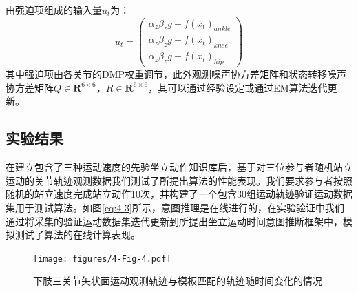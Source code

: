 由强迫项组成的输入量$u_t$为：
\begin{equation}
    u_t=\left(\begin{array}{l}
        \alpha_z \beta_z g+ f\left(x_t\right)_{ankle}\\
        \alpha_z \beta_z g+ f\left(x_t\right)_{knee}\\
        \alpha_z \beta_z g+ f\left(x_t\right)_{hip}
    \end{array}\right)
    \label{eq:4-43}
\end{equation}
其中强迫项由各关节的DMP权重调节，此外观测噪声协方差矩阵和状态转移噪声协方差矩阵$Q\in \mathbf{R}^{6 \times 6}$，$R\in \mathbf{R}^{6 \times 6}$，其可以通过经验设定或通过EM算法迭代更新\cite{bishopPatternRecognitionMachine2006}。

\subsection{实验结果} 
在建立包含了三种运动速度的先验坐立动作知识库后，基于对三位参与者随机站立运动的关节轨迹观测数据我们测试了所提出算法的性能表现。我们要求参与者按照随机的站立速度完成站立动作10次，并构建了一个包含30组运动轨迹验证运动数据集用于测试算法。如图\ref{eq:4-3}所示，意图推理是在线进行的，在实验验证中我们通过将采集的验证运动数据集迭代更新到所提出坐立运动时间意图推断框架中，模拟测试了算法的在线计算表现。

\begin{figure}[!t]
    \centering
    {
        \begin{minipage}{9.5in}
            \centering
            \texttt{[image: figures/4-Fig-4.pdf]}
            \caption{下肢三关节矢状面运动观测轨迹与模板匹配的轨迹随时间变化的情况}
        \label{fig:4-4}
        \end{minipage}
    }
\end{figure}

